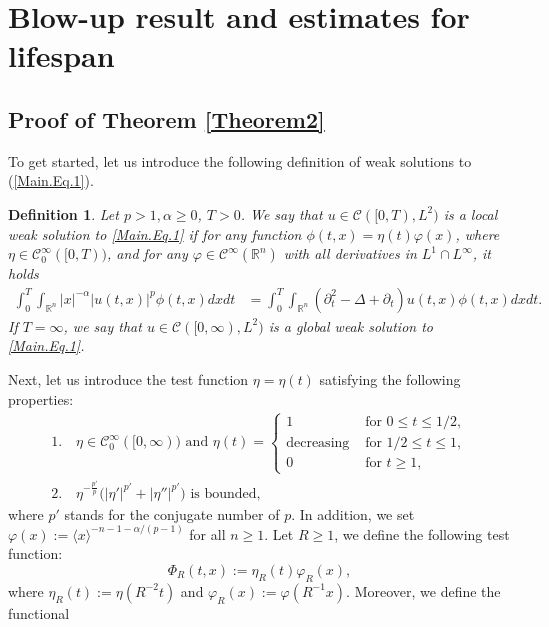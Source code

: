 \documentclass[11pt,reqno]{amsart}
\newtheorem{definition}{Definition}[section]
\newcommand{\R}{\mathbb{R}}
\newcommand{\ity}{\infty}
\begin{document}
\section{Blow-up result and estimates for lifespan} \label{Proof of blow-up results}

\subsection{Proof of Theorem \ref{Theorem2}}
To get started, let us introduce the following definition of weak solutions to (\ref{Main.Eq.1}).
\begin{definition} \label{defweaksolution_1}
Let $p>1, \alpha \geq 0$,  $T>0$. We say that $u \in \mathcal{C}([0, T), L^2) $ is a local weak solution to \eqref{Main.Eq.1} if for any function $\phi(t,x)= \eta(t) \varphi(x)$, where $\eta \in \mathcal{C}_0^{\infty}([0, T))$,  and for any $\varphi \in \mathcal{C}^{\infty}(\mathbb{R}^n)$ with all derivatives in $L^1 \cap L^\infty$, it holds
\begin{align*}
\int_0^T \int_{\R^n} |x|^{-\alpha} |u(t,x)|^p \phi(t,x)dxdt &= \int_0^T \int_{\R^n} (\partial_t^2 - \Delta + \partial_t)u(t,x) \phi(t,x)dxdt.
\end{align*}
If $T= \ity$, we say that $u \in \mathcal{C}([0, \infty), L^2)$ is a global weak solution to \eqref{Main.Eq.1}. 
\end{definition}

Next, let us introduce the test function $\eta= \eta(t)$ satisfying the following properties:
\begin{align*}
&1.\quad \eta \in \mathcal{C}_0^\ity([0,\ity)) \text{ and }
\eta(t)=\begin{cases}
1 &\text{ for }0 \le t \le 1/2, \\
\text{decreasing} &\text{ for }1/2\le t\le 1, \\
0 &\text{ for }t \ge 1,
\end{cases} & \nonumber \\
&2.\quad \eta^{-\frac{p'}{p}}\big(|\eta'|^{p'}+|\eta''|^{p'}\big) \text{ is bounded, }
\end{align*}
where $p'$ stands for the conjugate number of $p$. In addition, we set $\varphi(x) := \langle x \rangle^{-n-1-\alpha/(p-1)}$ for all $n \geq 1$. Let $R \geq 1$, we define the following test function:
$$ \Phi_{R}(t,x):= \eta_{R}(t) \varphi_R(x), $$
where $\eta_{R}(t):= \eta(R^{-2}t)$ and $\varphi_R(x):= \varphi(R^{-1}x)$. Moreover, we define the functional
\end{document}

